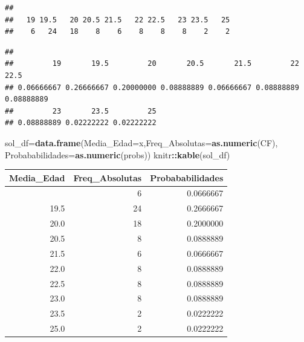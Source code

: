 \documentclass[
]{article}
\newenvironment{Shaded}{\begin{snugshade}}{\end{snugshade}}
\newcommand{\AttributeTok}[1]{\textcolor[rgb]{0.13,0.29,0.53}{#1}}
\newcommand{\FunctionTok}[1]{\textcolor[rgb]{0.13,0.29,0.53}{\textbf{#1}}}
\newcommand{\NormalTok}[1]{#1}
\newcommand{\OtherTok}[1]{\textcolor[rgb]{0.56,0.35,0.01}{#1}}
\newcommand{\SpecialCharTok}[1]{\textcolor[rgb]{0.81,0.36,0.00}{\textbf{#1}}}
\begin{document}
\begin{Shaded}
\end{Shaded}

\begin{verbatim}
## 
##   19 19.5   20 20.5 21.5   22 22.5   23 23.5   25 
##    6   24   18    8    6    8    8    8    2    2
\end{verbatim}

\begin{Shaded}
\end{Shaded}

\begin{verbatim}
## 
##         19       19.5         20       20.5       21.5         22       22.5 
## 0.06666667 0.26666667 0.20000000 0.08888889 0.06666667 0.08888889 0.08888889 
##         23       23.5         25 
## 0.08888889 0.02222222 0.02222222
\end{verbatim}

\begin{Shaded}
\begin{Highlighting}[]
\NormalTok{sol\_df}\OtherTok{=}\FunctionTok{data.frame}\NormalTok{(}\AttributeTok{Media\_Edad=}\NormalTok{x,}\AttributeTok{Freq\_Absolutas=}\FunctionTok{as.numeric}\NormalTok{(CF),}
                  \AttributeTok{Probababilidades=}\FunctionTok{as.numeric}\NormalTok{(probs))}
\NormalTok{knitr}\SpecialCharTok{::}\FunctionTok{kable}\NormalTok{(sol\_df)}
\end{Highlighting}
\end{Shaded}

\begin{longtable}[]{@{}rrr@{}}
\toprule\noalign{}
Media\_Edad & Freq\_Absolutas & Probababilidades \\
\midrule\noalign{}
\endhead
\bottomrule\noalign{}
\endlastfoot
19.0 & 6 & 0.0666667 \\
19.5 & 24 & 0.2666667 \\
20.0 & 18 & 0.2000000 \\
20.5 & 8 & 0.0888889 \\
21.5 & 6 & 0.0666667 \\
22.0 & 8 & 0.0888889 \\
22.5 & 8 & 0.0888889 \\
23.0 & 8 & 0.0888889 \\
23.5 & 2 & 0.0222222 \\
25.0 & 2 & 0.0222222 \\
\end{longtable}
\end{document}
